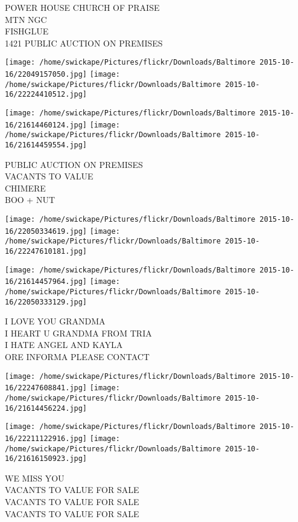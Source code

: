 \documentclass[10pt,letterpaper]{article}
\begin{document}
POWER HOUSE CHURCH OF PRAISE\\
MTN NGC\\
FISHGLUE\\
1421 PUBLIC AUCTION ON PREMISES
\pagebreak

\texttt{[image: /home/swickape/Pictures/flickr/Downloads/Baltimore 2015-10-16/22049157050.jpg]}
\texttt{[image: /home/swickape/Pictures/flickr/Downloads/Baltimore 2015-10-16/22224410512.jpg]}

\texttt{[image: /home/swickape/Pictures/flickr/Downloads/Baltimore 2015-10-16/21614460124.jpg]}
\texttt{[image: /home/swickape/Pictures/flickr/Downloads/Baltimore 2015-10-16/21614459554.jpg]}

PUBLIC AUCTION ON PREMISES\\
VACANTS TO VALUE\\
CHIMERE\\
BOO + NUT
\pagebreak

\texttt{[image: /home/swickape/Pictures/flickr/Downloads/Baltimore 2015-10-16/22050334619.jpg]}
\texttt{[image: /home/swickape/Pictures/flickr/Downloads/Baltimore 2015-10-16/22247610181.jpg]}

\texttt{[image: /home/swickape/Pictures/flickr/Downloads/Baltimore 2015-10-16/21614457964.jpg]}
\texttt{[image: /home/swickape/Pictures/flickr/Downloads/Baltimore 2015-10-16/22050333129.jpg]}

I LOVE YOU GRANDMA\\
I HEART U GRANDMA FROM TRIA\\
I HATE ANGEL AND KAYLA\\
ORE INFORMA PLEASE CONTACT
\pagebreak

\texttt{[image: /home/swickape/Pictures/flickr/Downloads/Baltimore 2015-10-16/22247608841.jpg]}
\texttt{[image: /home/swickape/Pictures/flickr/Downloads/Baltimore 2015-10-16/21614456224.jpg]}

\texttt{[image: /home/swickape/Pictures/flickr/Downloads/Baltimore 2015-10-16/22211122916.jpg]}
\texttt{[image: /home/swickape/Pictures/flickr/Downloads/Baltimore 2015-10-16/21616150923.jpg]}

WE MISS YOU\\
VACANTS TO VALUE FOR SALE\\
VACANTS TO VALUE FOR SALE\\
VACANTS TO VALUE FOR SALE
\pagebreak
\end{document}
